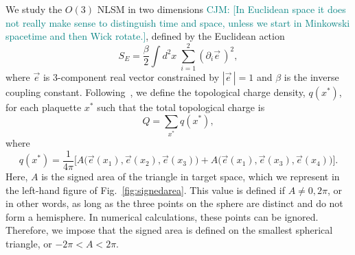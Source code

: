 \documentclass[a4paper,11pt]{article}
\newcommand{\e}{\vec e}
\newcommand\chris[1]{\textcolor{teal}{CJM: #1}}
\begin{document}
We study the $O(3)$ NLSM in two dimensions \chris{[In Euclidean space it does not really make sense to distinguish time and space, unless we start in Minkowski spacetime and then Wick rotate.]}, defined by the Euclidean action
\begin{equation*}
    \label{eq:nlsm euclidean action}
    S_E = \frac{\beta}{2} \int d^2x \; \sum_{i=1}^{2}\left(\partial_i \e\, \right)^2,
\end{equation*}
where $\e$ is 3-component real vector constrained by $|\e\,|=1$ and $\beta$ is the inverse coupling constant. Following~\cite{berg1981}, we define the topological charge density, $q(x^*)$, for each plaquette $x^*$ such that the total topological charge is
\begin{equation}
    Q = \sum_{x^*} q(x^*),
\end{equation}
where
\begin{equation}
    q(x^*) = \frac{1}{4\pi} \bigg[A\Big(\e(x_1), \e(x_2), \e(x_3)\Big) + A\Big(\e(x_1), \e(x_3), \e(x_4)\Big) \bigg].
\end{equation}
Here, $A$ is the signed area of the triangle in target space, which we represent in the left-hand figure of Fig.~\ref{fig:signedarea}. This value is defined if $A\neq 0, 2\pi$, or in other words, as long as the three points on the sphere are distinct and do not form a hemisphere. In numerical calculations, these points can be ignored. Therefore, we impose that the signed area is defined on the smallest spherical triangle, or $-2\pi < A < 2\pi$.
\end{document}
